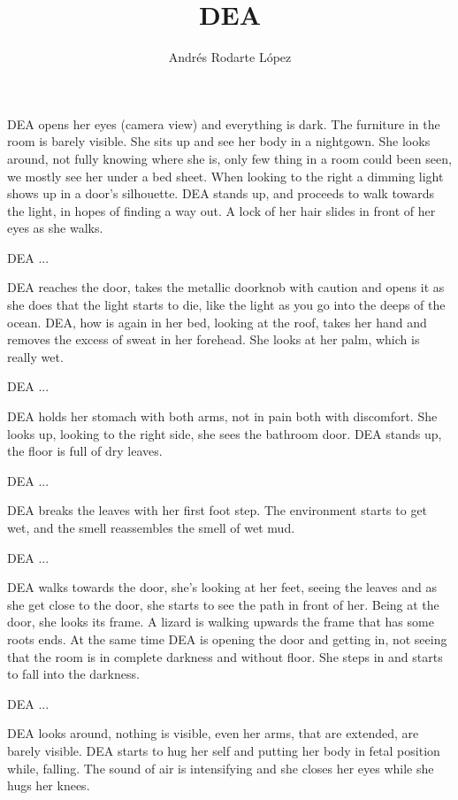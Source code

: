 \documentclass{screenplay}[2012/06/30]
\title{DEA}
\author{Andrés Rodarte López}
\begin{document}
\coverpage
{}
DEA opens her eyes (camera view) and everything is dark. 
The furniture in the room is barely visible.
She sits up and see her body in a nightgown. 
She looks around, not fully knowing where she is,
only few thing in a room could been seen, we mostly see her under a bed sheet. 
When looking to the right a dimming light shows up in a door's silhouette. 
DEA stands up, and proceeds to walk towards the light, in hopes of finding a
way out. A lock of her hair slides in front of her eyes as she walks.
\begin{dialogue}{DEA}
    ...
\end{dialogue}
DEA reaches the door, takes the metallic doorknob with caution and opens it as she 
does that the light starts to die, like the light as you go into the deeps of the ocean. 
\intercut
{}
DEA, how is again in her bed, looking at the roof, takes her hand and removes the excess of sweat in her forehead. 
She looks at her palm, which is really wet.
\begin{dialogue}{DEA}
    ...
\end{dialogue}
DEA holds her stomach with both arms, not in pain both with discomfort. She looks up,
looking to the right side, she sees the bathroom door. DEA stands up, the floor is full of 
dry leaves.
\begin{dialogue}{DEA}
    ...
\end{dialogue}
DEA breaks the leaves with her first foot step. 
The environment starts to get wet, and the 
smell reassembles the smell of wet mud.
\begin{dialogue}{DEA}
    ...
\end{dialogue}
DEA walks towards the door, she's looking at her feet, seeing the leaves and as she
get close to the door, she starts to see the path in front of her. 
Being at the door, she looks its frame.
A lizard is walking upwards the frame that has some roots ends. At the same time DEA is opening the door and 
getting in, not seeing that the room is in complete darkness and without floor. 
She steps in and starts to fall into the darkness.
\begin{dialogue}{DEA}
    ...
\end{dialogue}
DEA looks around, nothing is visible, even her arms, that are extended, are barely visible.
DEA starts to hug her self and putting her body in fetal position while, falling. The sound of air is
intensifying and she closes her eyes while she hugs her knees.
\end{document}
